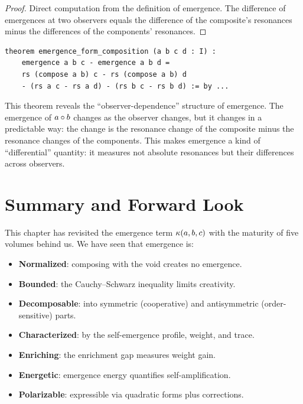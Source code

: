 \begin{proof}
Direct computation from the definition of emergence. The difference of emergences
at two observers equals the difference of the composite's resonances minus the
differences of the components' resonances.
\end{proof}

\begin{lstlisting}[caption={Form composition (IDT\_v3\_Emergence.lean)}]
theorem emergence_form_composition (a b c d : I) :
    emergence a b c - emergence a b d =
    rs (compose a b) c - rs (compose a b) d
    - (rs a c - rs a d) - (rs b c - rs b d) := by ...
\end{lstlisting}

\begin{interpretation}
This theorem reveals the ``observer-dependence'' structure of emergence. The
emergence of $a \circ b$ changes as the observer changes, but it changes in
a predictable way: the change is the resonance change of the composite minus
the resonance changes of the components. This makes emergence a kind of
``differential'' quantity: it measures not absolute resonances but their
differences across observers.
\end{interpretation}


\section{Summary and Forward Look}

This chapter has revisited the emergence term $\kappa(a,b,c)$ with the maturity
of five volumes behind us. We have seen that emergence is:
\begin{itemize}
  \item \textbf{Normalized}: composing with the void creates no emergence.
  \item \textbf{Bounded}: the Cauchy--Schwarz inequality limits creativity.
  \item \textbf{Decomposable}: into symmetric (cooperative) and antisymmetric
    (order-sensitive) parts.
  \item \textbf{Characterized}: by the self-emergence profile, weight, and trace.
  \item \textbf{Enriching}: the enrichment gap measures weight gain.
  \item \textbf{Energetic}: emergence energy quantifies self-amplification.
  \item \textbf{Polarizable}: expressible via quadratic forms plus corrections.
\end{itemize}

